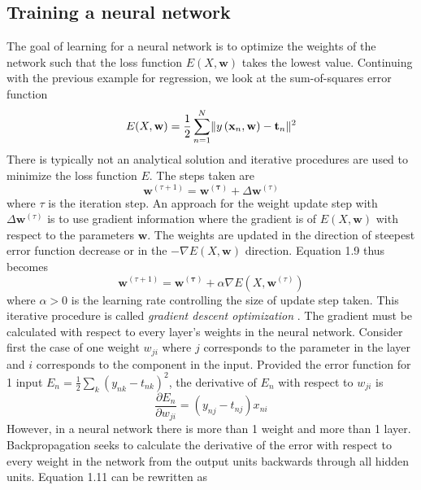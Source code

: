 \subsection{Training a neural network}
The goal of learning for a neural network is to optimize the weights of the network such 
that the loss function $E(X, \mathbf{w})$ takes the lowest value. Continuing with the 
previous example for regression, we look at the sum-of-squares error function 
\begin{equation}
    E(X, \mathbf{w}) = \frac{1}{2}\sum_{n=1}^{N} \lVert y\left(\mathbf{x}_n, \mathbf{w}  \right) - \mathbf{t}_n\rVert^2
\end{equation}
There is typically not an analytical solution and iterative procedures are used to 
minimize the loss function $E$. The steps taken are
\begin{equation}
    \mathbf{w}^{(\tau+1)} = \mathbf{w^{(\tau)}} + \Delta \mathbf{w}^{(\tau)}
\end{equation} where $\tau$ is the iteration step. An approach for the weight update step 
with $\Delta \mathbf{w}^{(\tau)}$ is to use gradient information where the gradient is 
of $E(X, \mathbf{w})$ with respect to the parameters $\mathbf{w}$. The weights are 
updated in the direction of steepest error function decrease or in the 
$- \nabla E(X, \mathbf{w})$ direction. Equation 1.9 thus becomes
\begin{equation}
     \mathbf{w}^{(\tau+1)} = \mathbf{w^{(\tau)}} + \alpha \nabla E\left( X, \mathbf{w}^{(\tau)} \right)
\end{equation} where $\alpha > 0$ is the learning rate controlling the size of update step taken. This iterative procedure is called 
\textit{gradient descent optimization} \cite{RumHinWil:86}. The gradient must be calculated with respect to every layer's weights in the 
neural network. Consider first the case of one weight $w_{ji}$ where $j$ corresponds to the parameter in the layer and $i$ corresponds to the 
component in the input. Provided the error function for 1 input $E_n = \frac{1}{2} \sum_{k} (y_{nk} - t_{nk})^2$, the derivative of 
$E_n$ with respect to $w_{ji}$ is 
\begin{equation}
    \frac{\partial E_n}{\partial w_{ji}} = (y_{nj} - t_{nj})x_{ni}
\end{equation}
However, in a neural network there is more than 1 weight and more than 1 layer. Backpropagation seeks to calculate the derivative of the 
error with respect to every weight in the network from the output units backwards through all hidden units. Equation 1.11 can be rewritten as 
